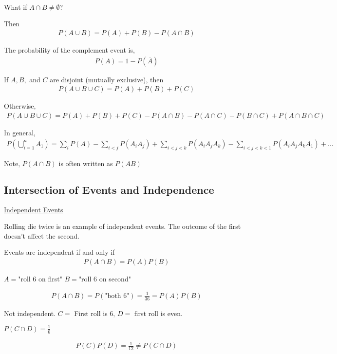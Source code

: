 \documentclass{article}
\begin{document}
What if $A \cap B \ne \emptyset$?

Then
\begin{align*}
    P(A \cup B) = P(A) + P(B) - P(A \cap B)
\end{align*}


The probability of the complement event is,
\begin{align*}
    P(A) = 1 - P(\overline{A})
\end{align*}

If $A,B,$ and $C$ are disjoint (mutually exclusive), then
\begin{align*}
    P(A \cup B \cup C) = P(A) + P(B) + P(C)
\end{align*}

Otherwise,
\begin{align*}
    P(A \cup B \cup C) = P(A) + P(B) + P(C) - P(A \cap B) - P(A \cap C) - P(B \cap C) + P(A \cap B \cap C)
\end{align*}

In general,
\begin{align*}
    P(\bigcup_{i=1}^nA_1) = \sum_{i}P(A) - \sum_{i < j}P(A_iA_j) + \sum_{i < j < k}P(A_iA_jA_k) - \sum_{i < j < k < 1}P(A_iA_jA_kA_1) + \ldots
\end{align*}

Note, $P(A \cap B)$ is often written as $P(AB)$


\subsection{Intersection of Events and Independence}

\underline{Independent Events}

Rolling die twice is an example of independent events. The outcome of the first doesn't affect the second. 

Events are independent if and only if
\begin{align*}
    P(A \cap B) = P(A)P(B)
\end{align*}

$A = $"roll 6 on first"
$B = $"roll 6 on second"

\begin{align*}
    P(A \cap B) = P(\text{"both 6"}) = \frac{1}{36} = P(A)P(B)
\end{align*}


Not independent. $C=$ First roll is 6, $D=$ first roll is even. 

$P(C \cap D) = \frac{1}{6}$

\begin{align*}
    P(C)P(D) = \frac{1}{12} \ne P(C \cap D)
\end{align*}
\end{document}
